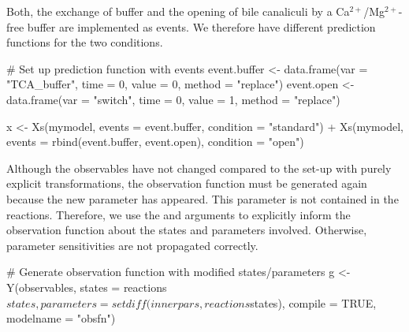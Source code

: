 \documentclass[article]{jss}
\begin{document}
\begin{CodeChunk}
\end{CodeChunk}

Both, the exchange of buffer and the opening of bile canaliculi by a Ca$^{2+}$/Mg$^{2+}$-free buffer are implemented as events. We therefore have different prediction functions for the two conditions.

\begin{CodeChunk}
\begin{CodeInput}
# Set up prediction function with events
event.buffer <- data.frame(var = "TCA_buffer", 
			   time = 0, 
			   value = 0, 
			   method = "replace")
event.open   <- data.frame(var = "switch", 
			   time = 0, 
			   value = 1, 
			   method = "replace")

x <- Xs(mymodel, 
	events = event.buffer, 
	condition = "standard") +
     Xs(mymodel, 
        events = rbind(event.buffer, event.open), 
	condition = "open")
\end{CodeInput}
\end{CodeChunk}

Although the observables have not changed compared to the set-up with purely explicit transformations, the observation function must be generated again because the new parameter  has appeared. This parameter is not contained in the reactions. Therefore, we use the  and  arguments to explicitly inform the observation function about the states and parameters involved. Otherwise, parameter sensitivities are not propagated correctly.

\begin{CodeChunk}
\begin{CodeInput}
# Generate observation function with modified states/parameters
g <- Y(observables,
       states = reactions$states,
       parameters = setdiff(innerpars, reactions$states),
       compile = TRUE, modelname = "obsfn")
\end{CodeInput}
\end{CodeChunk}
\end{document}
